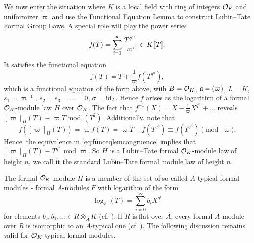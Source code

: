 We now enter the situation where $K$ is a local field with ring of integers
$\mathcal{O}_K$ and uniformizer $\varpi$ and 
use the Functional Equation Lemma to construct Lubin--Tate Formal Group Laws. 
A special role will play the power series
\begin{equation*}
  f(T) = \sum_{i=1}^\infty \frac{T^{q^{in}}}{\varpi^i} \in K\llbracket T \rrbracket.
\end{equation*}
It satisfies the functional equation
\begin{equation*}
  f(T) = T + \frac 1\varpi f(T^{q^n}),
\end{equation*}
which is a functional equation of the form above, with 
$B = \mathcal{O}_K$, $\mathfrak{a} = (\varpi)$, $L = K$, $s_1 = \varpi^{-1}$, $s_2 = s_3 = \dots = 0$,
$\sigma = \operatorname{id}_L$. 
Hence $f$ arises as the logarithm of a formal $\mathcal{O}_K$-module law $H$ over $\mathcal{O}_K$.
The fact that $f^{-1}(X) = X - \frac 1\varpi X^{q^n} + \dots$ reveals
$[\varpi]_H(T) \equiv \varpi T$ mod $(T^2)$. Additionally, note that 
\begin{equation*}
  f([\varpi]_H(T)) = \varpi f(T) = \varpi T + f(T^{q^n}) \equiv f(T^{q^n}) \pmod \varpi.
\end{equation*}
Hence, the equivalence in \eqref{eq:funceqlemcongruence} implies that 
$[\varpi]_H(T) \equiv T^{q^n}$ mod $\varpi$. So $H$ is a Lubin--Tate formal $\mathcal{O}_K$-module
law of height $n$, we call it the standard Lubin--Tate formal module law of
height $n$. 
\begin{rmk} 
  The formal $\mathcal{O}_K$-module $H$ is a member of the set of so called $A$-typical
  formal modules - formal $A$-modules $F$ with logarithm of the 
  form
  \begin{equation*}
    \log_F(T) = \sum_{i=0}^\infty b_i X^{q^i}
  \end{equation*}
  for elements $b_0, b_1, \dots \in R \otimes_A K$ (cf. \cite[Definition
  21.5.5 and Criterion 21.5.9]{hazewinkel1978formal}). If $R$ is flat over $A$,
  every formal $A$-module over $R$ is isomorphic to an $A$-typical one
  (cf. \cite[21.5.6]{hazewinkel1978formal}). The following discussion remains
  valid for $\mathcal{O}_K$-typical formal modules.
\end{rmk}

